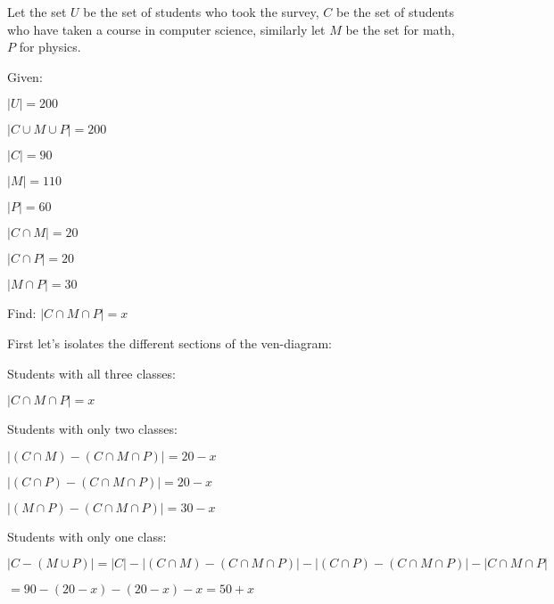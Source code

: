\documentclass{article}
\newenvironment{Solution}
{\noindent\color{red}}
{\newline}
\begin{document}
\begin{Solution}
    Let the set $U$ be the set of students who took the survey, $C$ be the set of students who have taken a course in computer science,
    similarly let $M$ be the set for math,  $P$ for physics. 

    \phantom{ }

    Given: 
    \begin{adjustwidth}{2em}{0em} 
        $|U| = 200$

        $|C \cup M \cup P| = 200$ 

        $|C| = 90$

        $|M| = 110$

        $|P| = 60$

        $|C \cap M| = 20$

        $|C \cap P| = 20$
        
        $|M \cap P| = 30$ 
    \end{adjustwidth}

    \phantom{ }

    Find: $|C \cap M \cap P| = x$

    \phantom{ }

    First let's isolates the different sections of the ven-diagram:

    \begin{adjustwidth}{2em}{0em}
        Students with all three classes:
        \begin{adjustwidth}{2em}{0em}
            $|C \cap M \cap P| = x$
        \end{adjustwidth}

        Students with only two classes:

        \begin{adjustwidth}{2em}{0em}
            $|(C \cap M) - (C \cap M \cap P)| = 20 - x$

            $|(C \cap P) - (C \cap M \cap P)| = 20 - x$

            $|(M \cap P)- (C \cap M \cap P)| = 30 - x$ 
        \end{adjustwidth}

        Students with only one class:

        \begin{adjustwidth}{2em}{0em}
            $|C - (M \cup P)|  = |C| - |(C \cap M) - (C \cap M \cap P)| - |(C \cap P) - (C \cap M \cap P)| - |C \cap M \cap P|$

            \hspace*{6.585em}$ = 90 - (20 - x) - (20 - x) - x = 50 + x$


\end{adjustwidth}
\end{adjustwidth}
\end{Solution}
\end{document}
